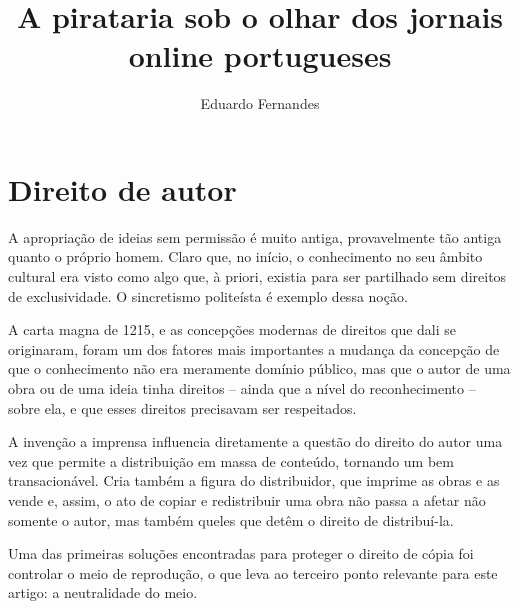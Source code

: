 \documentclass[jou]{apa6}
\title{A pirataria sob o olhar dos jornais online portugueses}
\author{Eduardo Fernandes}
\affiliation{Universidade Autónoma de Lisboa}
\begin{document}
\maketitle

\section{Direito de autor}

A apropriação de ideias sem permissão é muito antiga, provavelmente tão antiga quanto o próprio homem. Claro 
que, no início, o conhecimento no seu âmbito cultural era visto como algo que, à priori, existia para ser partilhado sem direitos de exclusividade. O sincretismo politeísta é exemplo dessa noção.

A carta magna de 1215, e as concepções modernas de direitos que dali se originaram, foram um dos fatores mais importantes a mudança da concepção de que o conhecimento não era meramente domínio público, mas que o autor de uma obra ou de uma ideia tinha direitos – ainda que a nível do reconhecimento – sobre ela, e que esses direitos precisavam ser respeitados.

A invenção a imprensa influencia diretamente a questão do direito do autor uma vez que permite a distribuição em massa de conteúdo, tornando um bem transacionável. Cria também a figura do distribuidor, que imprime as obras e as vende e, assim, o ato de copiar e redistribuir uma obra não passa a afetar não somente o autor, mas também queles que detêm o direito de distribuí-la.

Uma das primeiras soluções encontradas para proteger o direito de cópia foi controlar o meio de reprodução, o que leva ao terceiro ponto relevante para este artigo: a neutralidade do meio.

\printbibliography
\end{document}

